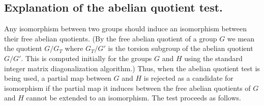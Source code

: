 \subsection{Explanation of the abelian quotient test.}
Any isomorphism between two groups should induce an isomorphism between
their free abelian quotients. (By the free abelian quotient of a group $G$ we
mean the quotient $G/G_T$ where $G_T/G'$ is the torsion subgroup of the abelian
quotient $G/G'$. This is computed initially for the groups $G$ and $H$
using the standard integer matrix diagonalization algorithm.)
Thus, when the abelian quotient test is being used, a partial map 
between $G$ and $H$ is
rejected as a candidate for isomorphism if the partial map it 
induces between the
free abelian quotients of $G$ and $H$ cannot be extended to an isomorphism. 
The test proceeds as follows.

